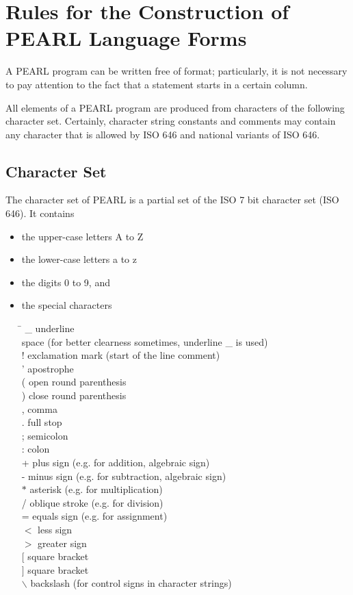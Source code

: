 \chapter{Rules for the Construction of PEARL Language Forms}   %

A PEARL program can be written free of format; particularly, it is not
necessary to pay attention to the fact that a statement starts in a
certain column.

All elements of a PEARL program are produced from characters of the
following character set. Certainly, character string constants and
comments may contain any character that is allowed by ISO 646 and
national variants of ISO 646.

\section{Character Set}   %

The character set of PEARL is a partial set of the ISO 7 bit character
set (ISO 646). It contains

\begin{itemize}
\item the upper-case letters A to Z
\item the lower-case letters a to z
\item the digits 0 to 9, and
\item the special characters
      \begin{tabbing}
      \x \=   \kill
      \_ \> underline\\
  \> space (for better clearness sometimes, underline \_ is used)\\
      !  \> exclamation mark (start of the line comment)\\
      '  \> apostrophe\\
      (  \> open round parenthesis\\
      )  \> close round parenthesis\\
      ,  \> comma\\
      .  \> full stop\\
      ;  \> semicolon\\
      :  \> colon\\
      +  \> plus sign (e.g. for addition, algebraic sign)\\
      -  \> minus sign (e.g. for subtraction, algebraic sign)\\
      $\ast$  \> asterisk (e.g. for multiplication)\\
      /  \> oblique stroke (e.g. for division)\\
      =  \> equals sign (e.g. for assignment)\\
      $<$  \> less sign\\
      $>$  \> greater sign\\
      $[$  \> square bracket\\
      $]$  \> square bracket\\
      $\backslash$ \> backslash (for control signs in character strings)
      \end{tabbing}
\end{itemize}

